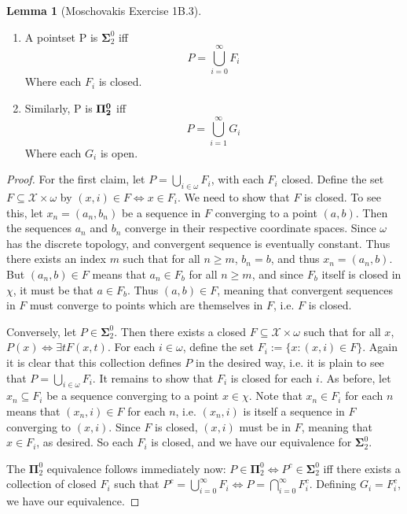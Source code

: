 \documentclass{article}
\theoremstyle{definition}
\newtheorem{lemma}{Lemma}[section]
\theoremstyle{plain}
\begin{document}
\begin{lemma}[Moschovakis Exercise 1B.3] \leavevmode
\begin{enumerate}
    \item A pointset P is $\bm{\Sigma}_2^0$ iff 
    \[ P = \bigcup_{i=0}^{\infty} F_i \]
    Where each $F_i$ is closed.
    \item Similarly, P is $\bf{\Pi}_2^0$ iff
    \[ P = \bigcup_{i=1}^{\infty} G_i \]
    Where each $G_i$ is open.
\end{enumerate}
\end{lemma}
\begin{proof}
    For the first claim, let $P = \bigcup_{i \in \omega} F_i$, with each $F_i$ closed. Define the set $F \subseteq \mathcal{X} \times \omega$ by $(x,i) \in F \iff x \in F_i$. We need to show that $F$ is closed. To see this, let $x_n = (a_n,b_n)$ be a sequence in $F$ converging to a point $(a,b)$. Then the sequences $a_n$ and $b_n$ converge in their respective coordinate spaces. Since $\omega$ has the discrete topology, and convergent sequence is eventually constant. Thus there exists an index $m$ such that for all $n \geq m$, $b_n = b$, and thus $x_n = (a_n,b)$. But $(a_n,b) \in F$ means that $a_n \in F_b$ for all $n \geq m$, and since $F_b$ itself is closed in $\chi$, it must be that $a \in F_b$. Thus $(a,b) \in F$, meaning that convergent sequences in $F$ must converge to points which are themselves in $F$, i.e. $F$ is closed. 
    \par Conversely, let $P \in \bm{\Sigma}_2^0$. Then there exists a closed $F \subseteq \mathcal{X} \times \omega$ such that for all $x$, $P(x) \iff \exists t F(x,t)$. For each $i \in \omega$, define the set $F_i := \{ x: (x,i) \in F \}$. Again it is clear that this collection defines $P$ in the desired way, i.e. it is plain to see that $P = \bigcup_{i\in \omega} F_i$. It remains to show that $F_i$ is closed for each $i$. As before, let $x_n \subseteq F_i$ be a sequence converging to a point $x \in \chi$. Note that $x_n \in F_i$ for each $n$ means that $(x_n,i) \in F$ for each $n$, i.e. $(x_n,i)$ is itself a sequence in $F$ converging to $(x,i)$. Since $F$ is closed, $(x,i)$ must be in $F$, meaning that $x \in F_i$, as desired. So each $F_i$ is closed, and we have our equivalence for $\bm{\Sigma}_2^0$.
    \par The $\bm{\Pi}_2^0$ equivalence follows immediately now: $P \in \bm{\Pi}_2^0 \iff P^c \in \bm{\Sigma}_2^0$ iff there exists a collection of closed $F_i$ such that $P^c = \bigcup_{i=0}^{\infty} F_i \iff P = \bigcap_{i=0}^{\infty}F_i^c$. Defining $G_i = F_i^c$, we have our equivalence. 
\end{proof}
\end{document}
